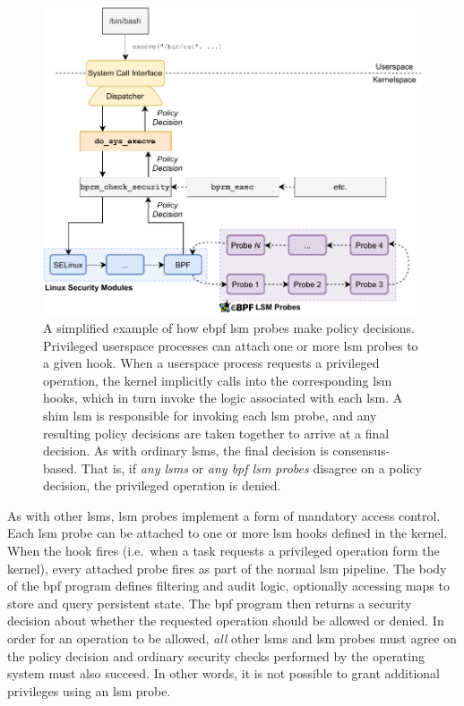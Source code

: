 \begin{figure}[tbp]
  \centering
  \includegraphics[width=0.8\linewidth]{figs/background/bpf-lsm.pdf}
  \caption[How eBPF LSM probes make policy decisions]{A simplified example of how \gls{ebpf} \gls{lsm} probes make policy decisions. Privileged userspace processes can attach one or more \gls{lsm} probes to a given hook. When a userspace process requests a privileged operation, the kernel implicitly calls into the corresponding \gls{lsm} hooks, which in turn invoke the logic associated with each \gls{lsm}. A shim \gls{lsm} is responsible for invoking each \gls{lsm} probe, and any resulting policy decisions are taken together to arrive at a final decision. As with ordinary \gls{lsm}s, the final decision is consensus-based. That is, if \textit{any \gls{lsm}s} or \textit{any \gls{bpf} \gls{lsm} probes} disagree on a policy decision, the privileged operation is denied.}%
  \label{fig:bpf-lsm}
\end{figure}

As with other \gls{lsm}s, \gls{lsm} probes implement a form of mandatory access control.
Each \gls{lsm} probe can be attached to one or more \gls{lsm} hooks defined in the kernel.
When the hook fires (i.e.~when a task requests a privileged operation form the kernel),
every attached probe fires as part of the normal \gls{lsm} pipeline. The body of the
\gls{bpf} program defines filtering and audit logic, optionally accessing maps to store
and query persistent state. The \gls{bpf} program then returns a security decision about
whether the requested operation should be allowed or denied.  In order for an operation to
be allowed, \textit{all} other \gls{lsm}s and \gls{lsm} probes must agree on the policy
decision and ordinary security checks performed by the operating system must also succeed.
In other words, it is not possible to grant additional privileges using an \gls{lsm}
probe.

